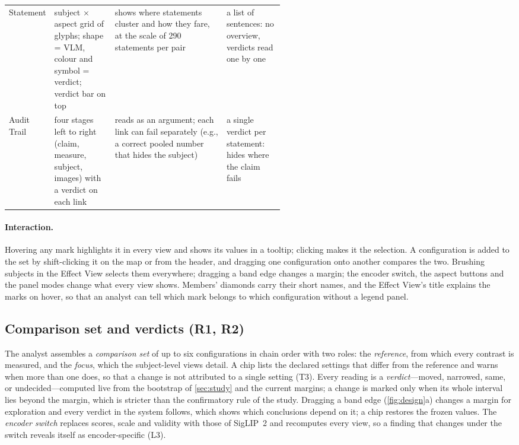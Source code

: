 \documentclass[review]{vgtc}                 %
\begin{document}
\begin{table}[tb]
\begin{tabularx}{\linewidth}{@{}>{\raggedright\arraybackslash}p{0.11\linewidth}>{\raggedright\arraybackslash}p{0.22\linewidth}>{\raggedright\arraybackslash}X>{\raggedright\arraybackslash}p{0.21\linewidth}@{}}
Statement & subject $\times$ aspect grid of glyphs; shape = VLM, colour and symbol = verdict; verdict bar on top & shows where statements cluster and how they fare, at the scale of 290 statements per pair & a list of sentences: no overview, verdicts read one by one \\
Audit Trail & four stages left to right (claim, measure, subject, images) with a verdict on each link & reads as an argument; each link can fail separately (e.g., a correct pooled number that hides the subject) & a single verdict per statement: hides where the claim fails \\
\bottomrule
\end{tabularx}
\end{table}

\paragraph{Interaction.}
Hovering any mark highlights it in every view and shows its values in a tooltip; clicking makes it the selection. A configuration is added to the set by shift-clicking it on the map or from the header, and dragging one configuration onto another compares the two. Brushing subjects in the Effect View selects them everywhere; dragging a band edge changes a margin; the encoder switch, the aspect buttons and the panel modes change what every view shows. Members' diamonds carry their short names, and the Effect View's title explains the marks on hover, so that an analyst can tell which mark belongs to which configuration without a legend panel.

\subsection{Comparison set and verdicts (R1, R2)}
\label{sec:verdicts}
The analyst assembles a \emph{comparison set} of up to six configurations in chain order with two roles: the \emph{reference}, from which every contrast is measured, and the \emph{focus}, which the subject-level views detail. A chip lists the declared settings that differ from the reference and warns when more than one does, so that a change is not attributed to a single setting (T3). Every reading is a \emph{verdict}---moved, narrowed, same, or undecided---computed live from the bootstrap of \cref{sec:study} and the current margins; a change is marked only when its whole interval lies beyond the margin, which is stricter than the confirmatory rule of the study. Dragging a band edge (\cref{fig:design}a) changes a margin for exploration and every verdict in the system follows, which shows which conclusions depend on it; a chip restores the frozen values. The \emph{encoder switch} replaces scores, scale and validity with those of SigLIP~2 and recomputes every view, so a finding that changes under the switch reveals itself as encoder-specific (L3).
\end{document}
